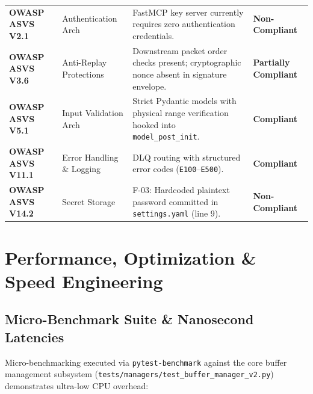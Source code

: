 \documentclass[10pt,a4paper]{report}
\begin{document}
\begin{table}[htbp]
\begin{tabularx}{\textwidth}{llXl}
\textbf{OWASP ASVS V2.1} & Authentication Arch & FastMCP key server currently requires zero authentication credentials. & \textbf{Non-Compliant} \\
\textbf{OWASP ASVS V3.6} & Anti-Replay Protections & Downstream packet order checks present; cryptographic nonce absent in signature envelope. & \textbf{Partially Compliant} \\
\textbf{OWASP ASVS V5.1} & Input Validation Arch & Strict Pydantic models with physical range verification hooked into \lstinline{model_post_init}. & \textbf{Compliant} \\
\textbf{OWASP ASVS V11.1} & Error Handling \& Logging & DLQ routing with structured error codes (\texttt{E100}--\texttt{E500}). & \textbf{Compliant} \\
\textbf{OWASP ASVS V14.2} & Secret Storage & F-03: Hardcoded plaintext password committed in \texttt{settings.yaml} (line 9). & \textbf{Non-Compliant} \\
\bottomrule
\end{tabularx}
\end{table}

\chapter{Performance, Optimization \& Speed Engineering}

\section{Micro-Benchmark Suite \& Nanosecond Latencies}
Micro-benchmarking executed via \texttt{pytest-benchmark} against the core buffer management subsystem (\texttt{tests/managers/test\_buffer\_manager\_v2.py}) demonstrates ultra-low CPU overhead:
\end{document}
